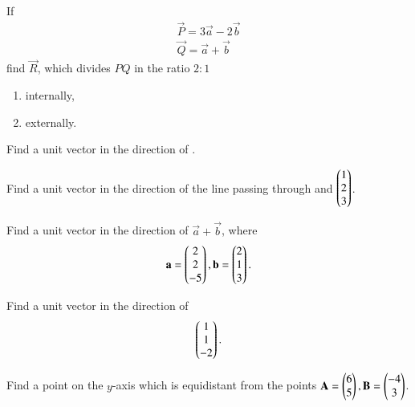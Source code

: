 %
\item If 
\begin{align}
\vec{P} = 3\vec{a}-2\vec{b}
\\
\vec{Q} = \vec{a}+\vec{b}
\end{align}
%
find $\vec{R}$, which divides $PQ$ in the ratio $2:1$
\begin{enumerate}
\item internally,
\item externally.
\end{enumerate}
%
\item Find a unit vector in the direction of .
%
\item Find a unit vector in the direction of the line passing through  and $\begin{pmatrix}1\\2\\3\end{pmatrix}$.
%
\item Find a unit vector in the direction of $\vec{a}+\vec{b}$, where 
%
\begin{align}
\mathbf{a} = \begin{pmatrix}2\\2\\-5\end{pmatrix}, \mathbf{b} = \begin{pmatrix}2\\1\\3\end{pmatrix}.
\end{align}
%
\item Find a unit vector in the direction of 
%
\begin{align}
\begin{pmatrix}1\\1\\-2\end{pmatrix}.
\end{align}
%
\item Find a point on the $y$-axis which is equidistant from the points $\mathbf{A} = \begin{pmatrix}6\\5\end{pmatrix}, \mathbf{B} = \begin{pmatrix}-4\\3\end{pmatrix}$.
\\
\solution


%

